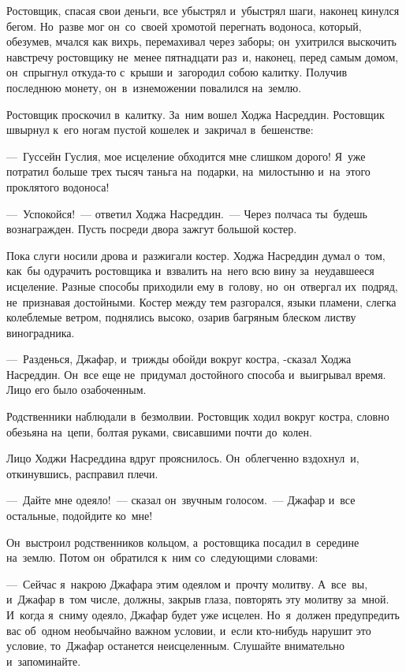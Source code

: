\documentclass[12pt,a4paper]{book}
\begin{document}
Ростовщик, спасая свои деньги, все убыстрял и~убыстрял шаги, наконец кинулся бегом. Но~разве мог он~со~своей хромотой перегнать водоноса, который, обезумев, мчался как вихрь, перемахивал через заборы; он~ухитрился выскочить навстречу ростовщику не~менее пятнадцати раз~и, наконец, перед самым домом, он~спрыгнул откуда-то с~крыши и~загородил собою калитку. Получив последнюю монету, он~в~изнеможении повалился на~землю.

Ростовщик проскочил в~калитку. За~ним вошел Ходжа Насреддин. Ростовщик швырнул к~его ногам пустой кошелек и~закричал в~бешенстве:

—~Гуссейн Гуслия, мое исцеление обходится мне слишком дорого! Я~уже потратил больше трех тысяч таньга на~подарки, на~милостыню и~на~этого проклятого водоноса!

—~Успокойся!~— ответил Ходжа Насреддин.~— Через полчаса ты~будешь вознагражден. Пусть посреди двора зажгут большой костер.

Пока слуги носили дрова и~разжигали костер. Ходжа Насреддин думал о~том, как~бы одурачить ростовщика и~взвалить на~него всю вину за~неудавшееся исцеление. Разные способы приходили ему в~голову, но~он~отвергал их~подряд, не~признавая достойными. Костер между тем разгорался, языки пламени, слегка колеблемые ветром, поднялись высоко, озарив багряным блеском листву виноградника.

—~Разденься, Джафар, и~трижды обойди вокруг костра, -сказал Ходжа Насреддин. Он~все еще не~придумал достойного способа и~выигрывал время. Лицо его было озабоченным.

Родственники наблюдали в~безмолвии. Ростовщик ходил вокруг костра, словно обезьяна на~цепи, болтая руками, свисавшими почти до~колен.

Лицо Ходжи Насреддина вдруг прояснилось. Он~облегченно вздохнул~и, откинувшись, расправил плечи.

—~Дайте мне одеяло!~— сказал он~звучным голосом.~— Джафар и~все остальные, подойдите ко~мне!

Он~выстроил родственников кольцом, а~ростовщика посадил в~середине на~землю. Потом он~обратился к~ним со~следующими словами:

—~Сейчас я~накрою Джафара этим одеялом и~прочту молитву. А~все~вы, и~Джафар в~том числе, должны, закрыв глаза, повторять эту молитву за~мной. И~когда я~сниму одеяло, Джафар будет уже исцелен. Но~я~должен предупредить вас об~одном необычайно важном условии, и~если кто-нибудь нарушит это условие, то~Джафар останется неисцеленным. Слушайте внимательно и~запоминайте.
\end{document}
